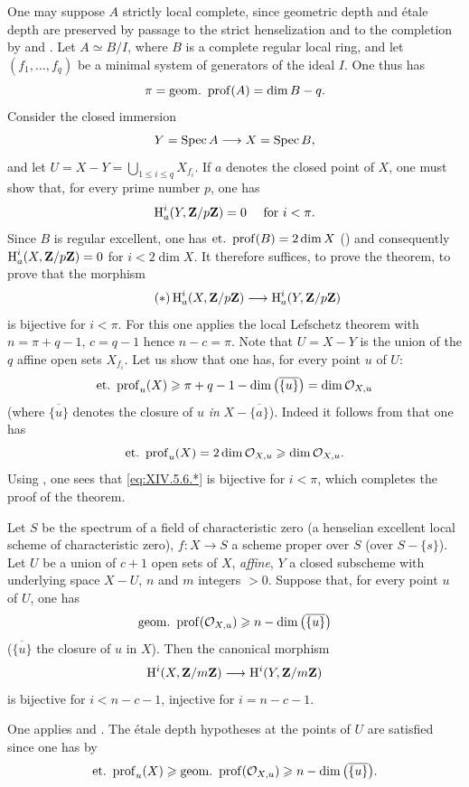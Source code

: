One may suppose $A$ strictly local complete, since geometric depth and \'etale depth are preserved by passage to the strict henselization and to the completion by  and . Let $A\simeq B/I$, where $B$ is a complete regular local ring, and let $(f_{1},\dots, f_{q})$ be a minimal system of generators of the ideal $I$. One thus has
$$
\pi=\operatorname{geom.\ prof}(A)=\dim B-q.
$$
Consider the closed immersion
$$Y=\Spec A\to X=\Spec B,
$$
and let $U=X-Y=\bigcup_{1\leq i\leq q}X_{f_{i}}$. If $a$ denotes the closed point of $X$, one must show that, for every prime number $p$, one has
$$
\operatorname{H}_{a}^{i}(Y, \mathbf{Z}/p\mathbf{Z})=0\quad\textrm{ for }i<\pi.
$$
Since $B$ is regular excellent, one has $\operatorname{et.\ prof}(B)=2\dim X$ (\cf {}) and consequently $\operatorname{H}_{a}^{i}(X, \mathbf{Z}/p\mathbf{Z})=0$ for $i<2\dim X$. It therefore suffices, to prove the theorem, to prove that the morphism
\begin{equation*} \label{eq:XIV.5.6.*} \tag{$*$}
\H_{a}^{i}(X, \ZZ/p\ZZ)\to\H_{a}^{i}(Y, \ZZ/p\ZZ)
\end{equation*}
is bijective for $i<\pi$. For this one applies the local Lefschetz theorem  with $n=\pi+q-1$, $c=q-1$ hence $n-c=\pi$. Note that $U=X-Y$ is the union of the $q$ affine open sets $X_{f_{i}}$. Let us show that one has, for every point $u$ of $U$:
$$
\operatorname{et.\ prof}_{u}(X)\geqslant\pi+q-1-\dim\big(\overline{\{ u\} }\big)=\dim{\mathcal O}_{X, u}$$
(where $\overline{\{ u\} }$ denotes the closure of $u$ \emph{in} $X-\overline{\{ a\} }$). Indeed it follows from  that one has
$$
\operatorname{et.\ prof}_{u}(X)=2\dim{\mathcal O}_{X, u}\geqslant\dim{\mathcal O}_{X, u}.
$$
Using , one sees that \eqref{eq:XIV.5.6.*} is bijective for $i<\pi$, which completes the proof of the theorem.

\begin{corollary} \label{XIV.5.7} Let $S$ be the spectrum of a field of characteristic zero (\resp a henselian excellent local scheme of characteristic zero), $f\colon X\to S$ a scheme proper over $S$ (\resp over $S-\{ s\}$). Let $U$ be a union of $c+1$ open sets of $X$, \emph{affine}, $Y$ a closed subscheme with underlying space $X-U$, $n$ and $m$ integers $>0$. Suppose that, for every point $u$ of $U$, one has
$$
\operatorname{geom.\ prof}({\mathcal O}_{X, u})\geqslant n-\dim\big(\overline{\{ u\} }\big)$$
($\overline{\{ u\} }$ the closure of $u$ in $X$). Then the canonical morphism
$$
\H^{i}(X, \ZZ/m\ZZ)\to\H^{i}(Y, \ZZ/m\ZZ)$$
is bijective for $i<n-c-1$, injective for $i=n-c-1$.
\end{corollary}

One applies  and . The \'etale depth hypotheses at the points of $U$ are satisfied since one has by  $$
\operatorname{et.\ prof}_{u}(X)\geqslant\operatorname{geom.\ prof}({\mathcal O}_{X, u})\geqslant n-\dim\big(\overline{\{ u\} }\big).
$$
